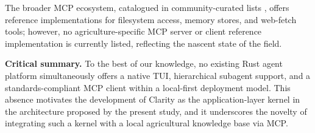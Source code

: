 The broader MCP ecosystem, catalogued in community-curated lists \cite{awesomemcp2025}, offers reference implementations for filesystem access, memory stores, and web-fetch tools; however, no agriculture-specific MCP server or client reference implementation is currently listed, reflecting the nascent state of the field.

\textbf{Critical summary.} To the best of our knowledge, no existing Rust agent platform simultaneously offers a native TUI, hierarchical subagent support, and a standards-compliant MCP client within a local-first deployment model. This absence motivates the development of Clarity as the application-layer kernel in the architecture proposed by the present study, and it underscores the novelty of integrating such a kernel with a local agricultural knowledge base via MCP.
